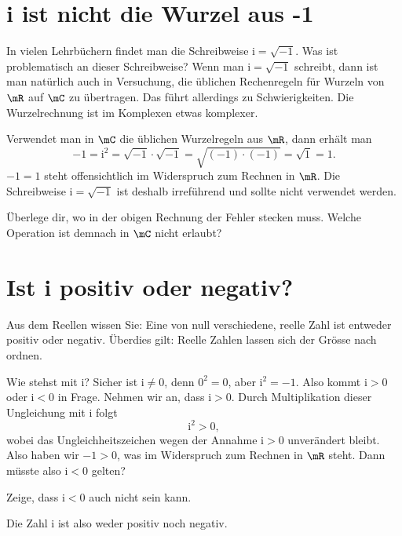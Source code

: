 \documentclass[%
11pt,%
twoside,%
titlepage,%
german,%
headsepline%
]{scrartcl}
\begin{document}
\section{i ist nicht die Wurzel aus -1}

In vielen Lehrb\"uchern findet man die Schreibweise $\mathrm{i} = \sqrt{-1}$. Was ist problematisch an dieser Schreibweise?
Wenn man $\mathrm{i} = \sqrt{-1}$ schreibt, dann ist man nat\"urlich auch in Versuchung, die \"ublichen Rechenregeln f\"ur Wurzeln von $\mR$ auf $\mC$ zu \"ubertragen. Das f\"uhrt allerdings zu Schwierigkeiten. Die Wurzelrechnung ist im Komplexen etwas komplexer.

\begin{bsp}
Verwendet man in $\mC$ die \"ublichen Wurzelregeln aus $\mR$, dann erhält man
$$
-1=\mathrm{i}^2=\sqrt{-1}\cdot\sqrt{-1}=\sqrt{(-1)\cdot(-1)}=\sqrt{1}=1.
$$
$-1=1$ steht offensichtlich im Widerspruch zum Rechnen in $\mR$. Die Schreibweise $\mathrm{i}=\sqrt{-1}$ ist deshalb irref\"uhrend und sollte nicht verwendet werden.
\end{bsp}

\begin{ueb}[Wurzeln]
Überlege dir, wo in der obigen Rechnung der Fehler stecken muss. Welche Operation ist demnach in $\mC$ nicht erlaubt?
\end{ueb}

\section{Ist i positiv oder negativ?}

Aus dem Reellen wissen Sie: Eine von null verschiedene, reelle Zahl ist entweder positiv oder negativ. Überdies gilt: Reelle Zahlen lassen sich der Gr\"osse nach ordnen.

Wie stehst mit $\mathrm{i}$? Sicher ist $\mathrm{i}\neq0$, denn $0^2=0$, aber $\mathrm{i}^2=-1$. Also kommt $\mathrm{i}>0$ oder $\mathrm{i}<0$ in Frage. Nehmen wir an, dass $\mathrm{i}>0$. Durch Multiplikation dieser Ungleichung mit $\mathrm{i}$ folgt
$$\mathrm{i}^2>0,$$
wobei das Ungleichheitszeichen wegen der Annahme $\mathrm{i}>0$ unverändert bleibt. Also haben wir $-1>0$, was im Widerspruch zum Rechnen in $\mR$ steht. Dann m\"usste also $\mathrm{i}<0$ gelten?

\begin{ueb}
Zeige, dass $\mathrm{i}<0$ auch nicht sein kann.
\end{ueb}

\begin{bem}
Die Zahl $\mathrm{i}$ ist also weder positiv noch negativ.
\end{bem}
\end{document}
